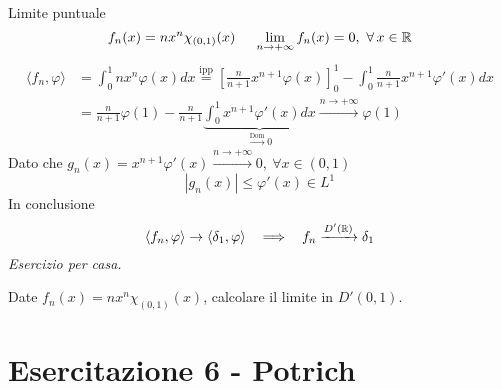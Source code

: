 Limite puntuale
\begin{equation*}
f_{n} (x)=nx^{n} \chi _{(0,1)} (x)\ \ \ \ \lim\limits _{n\rightarrow +\infty } f_{n}( x) =0,\ \forall x\in \RR 
\end{equation*}
\begin{equation*}
\begin{aligned}
\langle f_{n} ,\varphi \rangle  & =\int ^{1}_{0} nx^{n} \varphi ( x) dx\overset{\text{ipp}}{=}\left[\frac{n}{n+1} x^{n+1} \varphi ( x)\right]^{1}_{0} -\int ^{1}_{0}\frac{n}{n+1} x^{n+1} \varphi '( x) dx\\
 & =\frac{n}{n+1} \varphi ( 1) -\frac{n}{n+1}\underbrace{\int ^{1}_{0} x^{n+1} \varphi '( x) dx}_{\xrightarrow{\text{Dom}} 0}\xrightarrow{n\rightarrow +\infty } \varphi ( 1)
\end{aligned}
\end{equation*}
Dato che $g_{n}( x) =x^{n+1} \varphi '( x)\xrightarrow{n\rightarrow +\infty } 0,\ \forall x\in ( 0,1)$
\begin{equation*}
| g_{n}( x)| \leqslant \varphi '( x) \in L^{1}
\end{equation*}
In conclusione
\begin{equation*}
\langle f_{n} ,\varphi \rangle \rightarrow \langle \delta _{1} ,\varphi \rangle \ \ \implies \ \ f_{n}\xrightarrow{D'(\RR )} \delta _{1}
\end{equation*}
\textit{Esercizio per casa.}

Date $f_{n}( x) =nx^{n} \chi _{( 0,1)}( x)$, calcolare il limite in $D'( 0,1)$.
\chapter{Esercitazione 6 - Potrich}
\ParteEsercizi
\Esercizio{}

